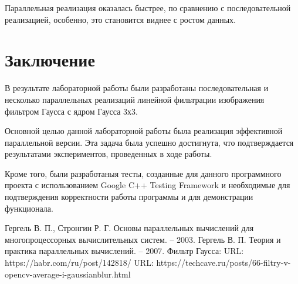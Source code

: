 \documentclass{report}
\begin{document}
\par Параллельная реализация оказалась быстрее, по сравнению с последовательной реализацией, особенно, это становится виднее с ростом данных. 
\newpage

\section*{Заключение}
В результате лабораторной работы были разработаны последовательная и несколько параллельных реализаций линейной фильтрации изображения фильтром Гаусса с ядром Гаусса 3х3.
\par Основной целью данной лабораторной работы была реализация эффективной параллельной версии. Эта задача была успешно достигнута, что подтверждается результатами экспериментов, проведенных в ходе работы.
\par Кроме того, были разработаныя тесты, созданные для данного программного проекта с использованием Google C++ Testing Framework и необходимые для подтверждения корректности работы программы и для демонстрации функционала.
\newpage

\begin{thebibliography}{1}
Гергель В. П., Стронгин Р. Г. Основы параллельных вычислений для многопроцессорных вычислительных систем. – 2003.
Гергель В. П. Теория и практика параллельных вычислений. – 2007. 
Фильтр Гаусса: URL: https://habr.com/ru/post/142818/
URL: https://techcave.ru/posts/66-filtry-v-opencv-average-i-gaussianblur.html
\end{thebibliography}
\newpage

\end{document}
